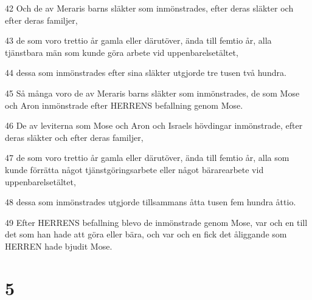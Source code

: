 \par 42 Och de av Meraris barns släkter som inmönstrades, efter deras släkter och efter deras familjer,
\par 43 de som voro trettio år gamla eller därutöver, ända till femtio år, alla tjänstbara män som kunde göra arbete vid uppenbarelsetältet,
\par 44 dessa som inmönstrades efter sina släkter utgjorde tre tusen två hundra.
\par 45 Så många voro de av Meraris barns släkter som inmönstrades, de som Mose och Aron inmönstrade efter HERRENS befallning genom Mose.
\par 46 De av leviterna som Mose och Aron och Israels hövdingar inmönstrade, efter deras släkter och efter deras familjer,
\par 47 de som voro trettio år gamla eller därutöver, ända till femtio år, alla som kunde förrätta något tjänstgöringsarbete eller något bärarearbete vid uppenbarelsetältet,
\par 48 dessa som inmönstrades utgjorde tillsammans åtta tusen fem hundra åttio.
\par 49 Efter HERRENS befallning blevo de inmönstrade genom Mose, var och en till det som han hade att göra eller bära, och var och en fick det åliggande som HERREN hade bjudit Mose.

\chapter{5}

